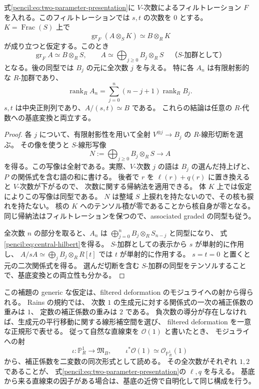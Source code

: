 \begin{lemma}\label{pencil:lem:double-pbw}
式\eqref{pencil:eq:two-parameter-presentation}に $V$-次数によるフィルトレーション
$F$ を入れる。このフィルトレーションでは $s,t$ の次数を $0$ とする。
$K=\operatorname{Frac}(S)$ 上で
\[
 \operatorname{gr}_F(A\otimes_SK)\simeq B\otimes_RK
\]
が成り立つと仮定する。このとき
\[
 \operatorname{gr}_F A\simeq B\otimes_RS,
 \qquad
 A\simeq\bigoplus_{j\geq0} B_j\otimes_RS
 \quad\text{（$S$-加群として）}
\]
となる。後の同型では $B_j$ の元に全次数 $j$ を与える。
特に各 $A_n$ は有限射影的な $R$-加群であり、
\begin{equation}\label{pencil:eq:central-hilbert}
 \operatorname{rank}_R A_n
 =\sum_{j=0}^n(n-j+1)\operatorname{rank}_R B_j.
\end{equation}
$s,t$ は中央正則列であり、$A/(s,t)\simeq B$ である。
これらの結論は任意の $R$-代数への基底変換と両立する。
\end{lemma}

\begin{proof}
各 $j$ について、有限射影性を用いて全射
$V^{\otimes j}\to B_j$ の $R$-線形切断を選ぶ。
その像を使うと $S$-線形写像
\[
 N:=\bigoplus_{j\geq0}B_j\otimes_RS\longrightarrow A
\]
を得る。この写像は全射である。実際、$V$-次数 $j$ の語は
$B_j$ の選んだ持上げと、$P$ の関係式を含む語の和に書ける。
後者で $r$ を $\ell(r)+q(r)$ に置き換えると $V$-次数が下がるので、
次数に関する帰納法を適用できる。
体 $K$ 上では仮定によりこの写像は同型である。
$N$ は整域 $S$ 上捩れを持たないので、その核も捩れを持たない。
核の $K$ へのテンソル積が零であることから核自身が零となる。
同じ帰納法はフィルトレーションを保つので、associated graded の同型も従う。

全次数 $n$ の部分を取ると、$A_n$ は
$\bigoplus_{j=0}^n B_j\otimes_R S_{n-j}$ と同型になり、
式\eqref{pencil:eq:central-hilbert}を得る。
$S$-加群としての表示から $s$ が単射的に作用し、
$A/sA\simeq\bigoplus_j B_j\otimes_RR[t]$ では $t$ が単射的に作用する。
$s=t=0$ と置くと元の二次関係式を得る。
選んだ切断を含む $S$-加群の同型をテンソルすることで、基底変換との両立性も分かる。
\end{proof}

この補題の generic な仮定は、filtered deformation のモジュライへの射から得られる。
Rains \cite[命題2.2--2.3、定理2.12]{PencilRainsFiltered} の規約では、
次数 $1$ の生成元に対する関係式の一次の補正係数の重みは $1$、
定数の補正係数の重みは $2$ である。
負次数の導分が存在しなければ、生成元の平行移動に関する線形補空間を選び、
filtered deformation を一意な正規形で表せる。
従って自然な直線束を $\mathcal O(1)$ と書いたとき、
モジュライへの射
\[
 \iota:\mathbb P^1_R\longrightarrow\mathfrak M_B,
 \qquad \iota^*\mathcal O(1)\simeq\mathcal O_{\mathbb P^1_R}(1)
\]
から、補正係数を二変数の同次形式として読める。
その全次数がそれぞれ $1,2$ であることが、
式\eqref{pencil:eq:two-parameter-presentation}の $\ell,q$ を与える。
基底から来る直線束の因子がある場合は、基底の近傍で自明化して同じ構成を行う。

